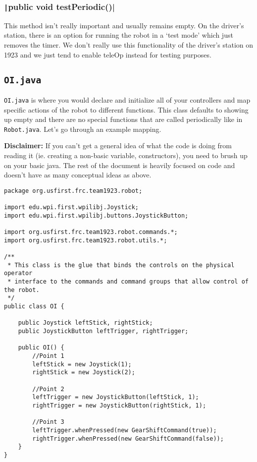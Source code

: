 \documentclass[11pt,fleqn]{article}
\newcommand{\mil}[2][java]{\texttt|#2|}
\begin{document}
\subsubsection{\mil{public void testPeriodic()}}
This method isn't really important and usually remains empty. On the driver's station, there is an option
for running the robot in a `test mode' which just removes the timer. We don't really use this functionality
of the driver's station on 1923 and we just tend to enable teleOp instead for testing purposes.

\subsection{\texttt{OI.java}}

\texttt{OI.java} is where you would declare and initialize all of your controllers and map specific actions
of the robot to different functions. This class defaults to showing up empty and there are no special
functions that are called periodically like in \texttt{Robot.java}. Let's go through an example mapping.

\textbf{Disclaimer:} If you can't get a general idea of what the code is doing from reading it (ie.
creating a non-basic variable, constructors), you need to brush up on your basic java. The rest of
the document is heavily focused on code and doesn't have as many conceptual ideas as above.

\begin{verbatim}
package org.usfirst.frc.team1923.robot;

import edu.wpi.first.wpilibj.Joystick;
import edu.wpi.first.wpilibj.buttons.JoystickButton;

import org.usfirst.frc.team1923.robot.commands.*;
import org.usfirst.frc.team1923.robot.utils.*;

/**
 * This class is the glue that binds the controls on the physical operator
 * interface to the commands and command groups that allow control of the robot.
 */
public class OI {

    public Joystick leftStick, rightStick;
    public JoystickButton leftTrigger, rightTrigger;

    public OI() {
        //Point 1
        leftStick = new Joystick(1);
        rightStick = new Joystick(2);

        //Point 2
        leftTrigger = new JoystickButton(leftStick, 1);
        rightTrigger = new JoystickButton(rightStick, 1);

        //Point 3
        leftTrigger.whenPressed(new GearShiftCommand(true));
        rightTrigger.whenPressed(new GearShiftCommand(false));
    }
}
\end{verbatim}
\end{document}
